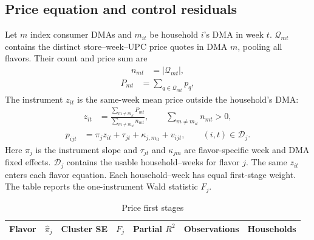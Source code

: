 \documentclass[11pt]{article}
\begin{document}
\subsection{Price equation and control residuals}
Let $m$ index consumer DMAs and $m_{it}$ be household $i$'s DMA in week $t$.
$\mathcal Q_{mt}$ contains the distinct store--week--UPC price quotes in DMA
$m$, pooling all flavors. Their count and price sum are
\begin{equation}
\begin{aligned}
n_{mt}&=|\mathcal Q_{mt}|,
\end{aligned}
\end{equation}
\begin{equation}
\begin{aligned}
P_{mt}&=\sum_{q\in\mathcal Q_{mt}}p_q,
\end{aligned}
\end{equation}
The instrument $z_{it}$ is the same-week mean price outside the household's DMA:
\begin{equation}
\begin{aligned}
z_{it}&=\frac{\sum_{m\ne m_{it}}P_{mt}}{\sum_{m\ne m_{it}}n_{mt}},\qquad \sum_{m\ne m_{it}}n_{mt}>0,
\end{aligned}
\end{equation}
\begin{equation}
\begin{aligned}
p_{ijt}&=\pi_j z_{it}
 +\tau_{jt}+\kappa_{j,m_{it}}+v_{ijt},\qquad (i,t)\in\mathcal D_j.
\end{aligned}
\end{equation}
Here $\pi_j$ is the instrument slope
and $\tau_{jt}$ and $\kappa_{jm}$ are flavor-specific week and DMA fixed effects.
$\mathcal D_j$ contains the usable household--weeks for flavor $j$.
The same $z_{it}$ enters each flavor equation. Each household--week has equal first-stage weight.
The table reports the one-instrument Wald statistic $F_j$.

\begin{table}[htbp]\centering\small
\caption{Price first stages}
\begin{tabular}{lrrrrrr}\toprule
Flavor & $\widehat\pi_j$ & Cluster SE & $F_j$ & Partial $R^2$ & Observations & Households\\\midrule
\end{tabular}
\end{table}
\end{document}

